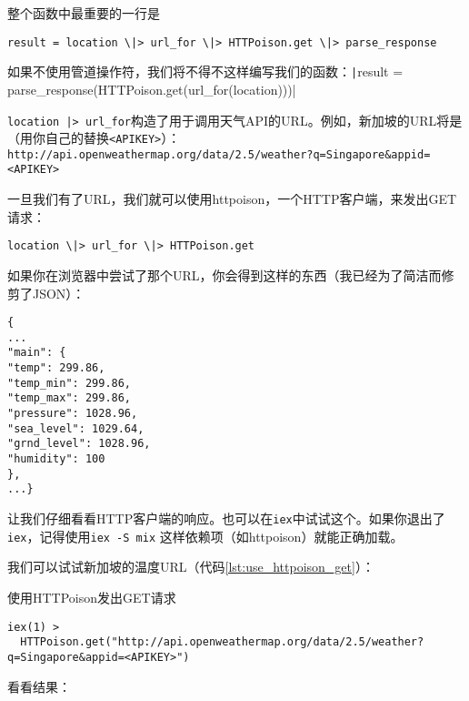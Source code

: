 整个函数中最重要的一行是
\begin{verbatim}
result = location \|> url_for \|> HTTPoison.get \|> parse_response
\end{verbatim}

如果不使用管道操作符，我们将不得不这样编写我们的函数：\texttt|result = parse_response(HTTPoison.get(url_for(location)))|

\texttt{location |> url\_for}构造了用于调用天气API的URL。例如，新加坡的URL将是（用你自己的替换\texttt{<APIKEY>}）：
\texttt{http://api.openweathermap.org/data/2.5/weather?q=Singapore\&appid=<APIKEY>}

一旦我们有了URL，我们就可以使用httpoison，一个HTTP客户端，来发出GET请求：
\begin{verbatim}
location \|> url_for \|> HTTPoison.get
\end{verbatim}

如果你在浏览器中尝试了那个URL，你会得到这样的东西（我已经为了简洁而修剪了JSON）：

\begin{code}{}
\begin{verbatim}
{
...
"main": {
"temp": 299.86,
"temp_min": 299.86,
"temp_max": 299.86,
"pressure": 1028.96,
"sea_level": 1029.64,
"grnd_level": 1028.96,
"humidity": 100
},
...}
\end{verbatim}
\end{code}

让我们仔细看看HTTP客户端的响应。也可以在\texttt{iex}中试试这个。如果你退出了\texttt{iex}，记得使用\texttt{iex -S mix}
这样依赖项（如httpoison）就能正确加载。

我们可以试试新加坡的温度URL（代码\ref{lst:use_httpoison_get}）：

\begin{code}{使用HTTPoison发出GET请求}
\begin{verbatim}
iex(1) >
  HTTPoison.get("http://api.openweathermap.org/data/2.5/weather?q=Singapore&appid=<APIKEY>")
\end{verbatim}
\label{lst:use_httpoison_get}
\end{code}

看看结果：

